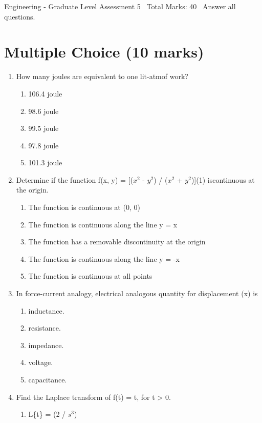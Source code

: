 \documentclass[12pt]{article}
\begin{document}
\begin{center}
Engineering - Graduate Level Assessment 5 \
Total Marks: 40 \
Answer all questions.
\end{center}

\section*{Multiple Choice (10 marks)}
\begin{enumerate}[label=\arabic*.]
\item How many joules are equivalent to one lit-atmof work?
\begin{enumerate}[label=(\alph*)]
    \item 106.4 joule
    \item 98.6 joule
    \item 99.5 joule
    \item 97.8 joule
    \item 101.3 joule
\end{enumerate}
\item Determine if the function f(x, y) = [($x^2$ - $y^2$) / ($x^2$ + $y^2$)](1) iscontinuous at the origin.
\begin{enumerate}[label=(\alph*)]
    \item The function is continuous at (0, 0)
    \item The function is continuous along the line y = x
    \item The function has a removable discontinuity at the origin
    \item The function is continuous along the line y = -x
    \item The function is continuous at all points
\end{enumerate}
\item In force-current analogy, electrical analogous quantity for displacement (x) is
\begin{enumerate}[label=(\alph*)]
    \item inductance.
    \item resistance.
    \item impedance.
    \item voltage.
    \item capacitance.
\end{enumerate}
\item Find the Laplace transform of f(t) = t, for t \textgreater{} 0.
\begin{enumerate}[label=(\alph*)]
    \item L\{t\} = (2 / $s^3$)

\end{enumerate}
\end{enumerate}
\end{document}
